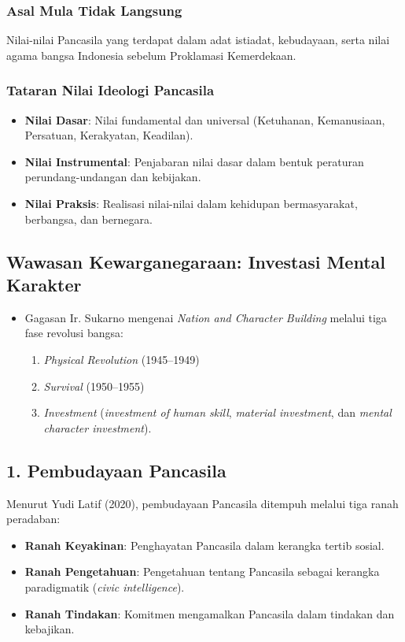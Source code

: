 \subsubsection{Asal Mula Tidak Langsung}
Nilai-nilai Pancasila yang terdapat dalam adat istiadat, kebudayaan, serta nilai agama bangsa Indonesia sebelum Proklamasi Kemerdekaan.

\subsubsection{Tataran Nilai Ideologi Pancasila}
\begin{itemize}
    \item \textbf{Nilai Dasar}: Nilai fundamental dan universal (Ketuhanan, Kemanusiaan, Persatuan, Kerakyatan, Keadilan).
    \item \textbf{Nilai Instrumental}: Penjabaran nilai dasar dalam bentuk peraturan perundang-undangan dan kebijakan.
    \item \textbf{Nilai Praksis}: Realisasi nilai-nilai dalam kehidupan bermasyarakat, berbangsa, dan bernegara.
\end{itemize}

\subsection{Wawasan Kewarganegaraan: Investasi Mental Karakter}
\begin{itemize}
    \item Gagasan Ir. Sukarno mengenai \textit{Nation and Character Building} melalui tiga fase revolusi bangsa:
    \begin{enumerate}
        \item \textit{Physical Revolution} (1945--1949)
        \item \textit{Survival} (1950--1955)
        \item \textit{Investment} (\textit{investment of human skill}, \textit{material investment}, dan \textit{mental character investment}).
    \end{enumerate}
\end{itemize}

\subsection{1. Pembudayaan Pancasila}
Menurut Yudi Latif (2020), pembudayaan Pancasila ditempuh melalui tiga ranah peradaban:
\begin{itemize}
    \item \textbf{Ranah Keyakinan}: Penghayatan Pancasila dalam kerangka tertib sosial.
    \item \textbf{Ranah Pengetahuan}: Pengetahuan tentang Pancasila sebagai kerangka paradigmatik (\textit{civic intelligence}).
    \item \textbf{Ranah Tindakan}: Komitmen mengamalkan Pancasila dalam tindakan dan kebajikan.
\end{itemize}

